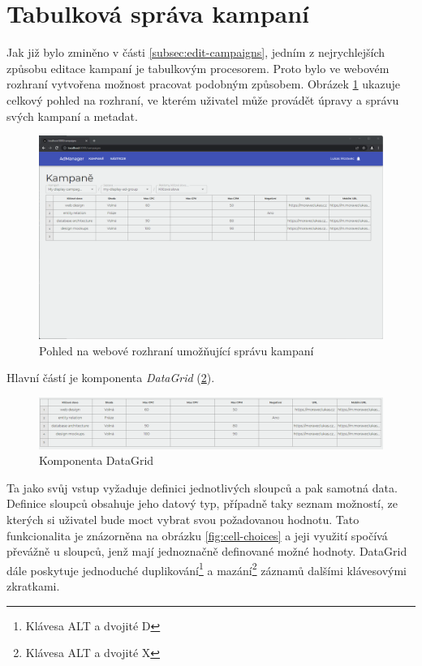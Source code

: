 \section{Tabulková správa kampaní}
Jak již bylo zminěno v části \ref{subsec:edit-campaigns}, jedním z nejrychlejších způsobu editace kampaní je tabulkovým procesorem.
Proto bylo ve webovém rozhraní vytvořena možnost pracovat podobným způsobem. Obrázek \ref{fig:datagrid-window} ukazuje celkový pohled na rozhraní, ve kterém uživatel
může provádět úpravy a správu svých kampaní a metadat.

\begin{figure}[h]
    \centering
    \includegraphics[width=1\textwidth]{Figures/ui/whole-window.png}
    \caption{Pohled na webové rozhraní umožňující správu kampaní}
    \label{fig:datagrid-window}
\end{figure}
Hlavní částí je komponenta \emph{DataGrid} (\ref{fig:datagrid}).
\begin{figure}[h]
    \centering
    \includegraphics[width=1\textwidth]{Figures/ui/datagrid.png}
    \caption{Komponenta DataGrid}
    \label{fig:datagrid}
\end{figure}
Ta jako svůj vstup vyžaduje definici jednotlivých sloupců
a pak samotná data. Definice sloupců obsahuje jeho datový typ, případně taky seznam možností, ze kterých si uživatel bude moct vybrat svou požadovanou hodnotu.
Tato funkcionalita je znázorněna na obrázku \ref{fig:cell-choices} a jeji využití spočívá převážně u sloupců, jenž mají jednoznačně definované možné hodnoty. DataGrid
dále poskytuje jednoduché duplikování\footnote{Klávesa ALT a dvojité D} a mazání\footnote{Klávesa ALT a dvojité X} záznamů dalšími klávesovými zkratkami. 

